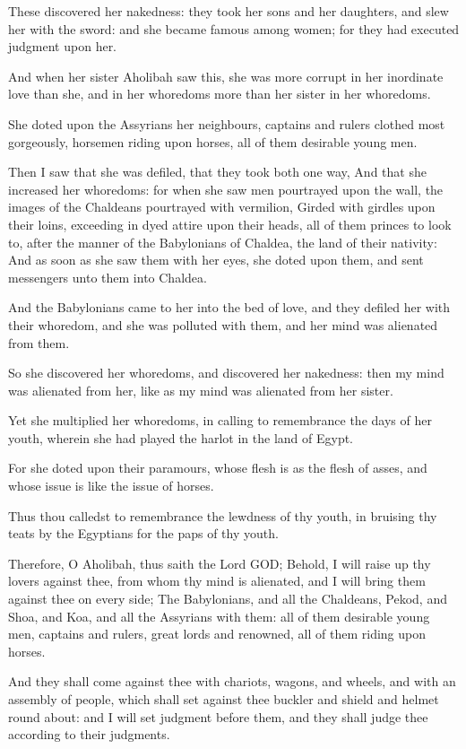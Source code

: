 \verse These discovered her nakedness: they took her sons and her daughters, and slew her with the sword: and she became famous among women; for they had executed judgment upon her.

\verse And when her sister Aholibah saw this, she was more corrupt in her inordinate love than she, and in her whoredoms more than her sister in her whoredoms.

\verse She doted upon the Assyrians her neighbours, captains and rulers clothed most gorgeously, horsemen riding upon horses, all of them desirable young men.

\verse Then I saw that she was defiled, that they took both one way, \verse And that she increased her whoredoms: for when she saw men pourtrayed upon the wall, the images of the Chaldeans pourtrayed with vermilion, \verse Girded with girdles upon their loins, exceeding in dyed attire upon their heads, all of them princes to look to, after the manner of the Babylonians of Chaldea, the land of their nativity: \verse And as soon as she saw them with her eyes, she doted upon them, and sent messengers unto them into Chaldea.

\verse And the Babylonians came to her into the bed of love, and they defiled her with their whoredom, and she was polluted with them, and her mind was alienated from them.

\verse So she discovered her whoredoms, and discovered her nakedness: then my mind was alienated from her, like as my mind was alienated from her sister.

\verse Yet she multiplied her whoredoms, in calling to remembrance the days of her youth, wherein she had played the harlot in the land of Egypt.

\verse For she doted upon their paramours, whose flesh is as the flesh of asses, and whose issue is like the issue of horses.

\verse Thus thou calledst to remembrance the lewdness of thy youth, in bruising thy teats by the Egyptians for the paps of thy youth.

\verse Therefore, O Aholibah, thus saith the Lord GOD; Behold, I will raise up thy lovers against thee, from whom thy mind is alienated, and I will bring them against thee on every side; \verse The Babylonians, and all the Chaldeans, Pekod, and Shoa, and Koa, and all the Assyrians with them: all of them desirable young men, captains and rulers, great lords and renowned, all of them riding upon horses.

\verse And they shall come against thee with chariots, wagons, and wheels, and with an assembly of people, which shall set against thee buckler and shield and helmet round about: and I will set judgment before them, and they shall judge thee according to their judgments.

